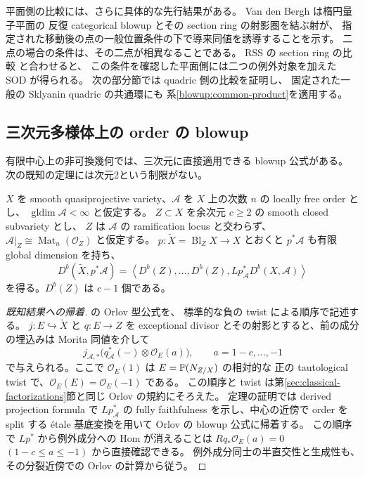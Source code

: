 平面側の比較には、さらに具体的な先行結果がある。
Van den Bergh \cite[定理11.1.3]{BlowupVdB2001} は楕円量子平面の
反復 categorical blowup とその section ring の射影圏を結ぶ射が、
指定された移動後の点の一般位置条件の下で導来同値を誘導することを示す。
二点の場合の条件は、その二点が相異なることである。
RSS の section ring の比較 \cite[第5節、定義5.1の直後、命題5.4]{BlowupRSS2015} と合わせると、
この条件を確認した平面側には二つの例外対象を加えた SOD が得られる。
次の部分節では quadric 側の比較を証明し、
固定された一般の Sklyanin quadric の共通環にも
系\ref{blowup:common-product}を適用する。



\subsection{三次元多様体上の order の blowup}
\label{blowup:orders}

有限中心上の非可換幾何では、三次元に直接適用できる blowup 公式がある。
次の既知の定理には次元2という制限がない。

\begin{theorem}\label{blowup:order-theorem}
$X$ を smooth quasiprojective variety、$\mathcal A$ を
$X$ 上の次数 $n$ の locally free order とし、
$\operatorname{gldim}\mathcal A<\infty$ と仮定する。
$Z\subset X$ を余次元 $c\geq2$ の smooth closed subvariety とし、
$Z$ は $\mathcal A$ の ramification locus と交わらず、
$\mathcal A|_Z\cong\operatorname{Mat}_n(\mathcal O_Z)$ と仮定する。
$p\colon\widetilde X=\operatorname{Bl}_Z X\to X$ とおくと
$p^*\mathcal A$ も有限 global dimension を持ち、
\begin{equation}\label{blowup:order-sod}
 D^b(\widetilde X,p^*\mathcal A)
 =\left\langle
   D^b(Z),\ldots,D^b(Z),
   Lp^*_{\mathcal A}D^b(X,\mathcal A)
 \right\rangle
\end{equation}
を得る。$D^b(Z)$ は $c-1$ 個である。
\end{theorem}

\begin{proof}[既知結果への帰着]
\cite[定理30、注意31]{BlowupBP2018} の Orlov 型公式を、
標準的な負の twist による順序で記述する。
$j\colon E\hookrightarrow\widetilde X$ と $q\colon E\to Z$ を
exceptional divisor とその射影とすると、前の成分の埋込みは
Morita 同値を介して
\[
 j_{\mathcal A,*}
 \bigl(q_{\mathcal A}^*(-)\otimes\mathcal O_E(a)\bigr),
 \qquad a=1-c,\ldots,-1
\]
で与えられる。ここで $\mathcal O_E(1)$ は $E=\mathbb P(N_{Z/X})$ の相対的な
正の tautological twist で、$\mathcal O_E(E)=\mathcal O_E(-1)$ である。
この順序と twist は第\ref{sec:classical-factorizations}節と同じ Orlov の規約にそろえた。
定理の証明では derived projection formula で $Lp^*_{\mathcal A}$ の
fully faithfulness を示し、中心の近傍で order を split する
\'etale 基底変換を用いて Orlov の blowup 公式に帰着する。
この順序で $Lp^*$ から例外成分への Hom が消えることは
$Rq_*\mathcal O_E(a)=0$ $(1-c\le a\le-1)$ から直接確認できる。
例外成分同士の半直交性と生成性も、その分裂近傍での Orlov の計算から従う。
\end{proof}

